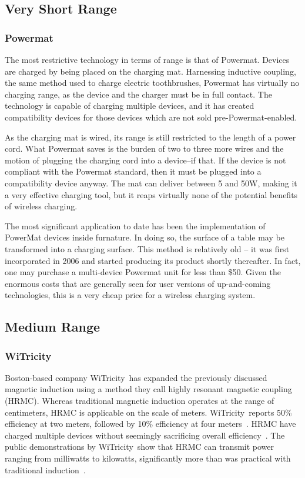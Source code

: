 \subsection{Very Short Range}
\subsubsection{Powermat}
The most restrictive technology in terms of range is that of Powermat. Devices are charged by being placed on the charging mat. Harnessing inductive coupling, the same method used to charge electric toothbrushes, Powermat has virtually no charging range, as the device and the charger must be in full contact. The technology is capable of charging multiple devices, and it has created compatibility devices for those devices which are not sold pre-Powermat-enabled.

As the charging mat is wired, its range is still restricted to the length of a power cord. What Powermat saves is the burden of two to three more wires and the motion of plugging the charging cord into a device--if that. If the device is not compliant with the Powermat standard, then it must be plugged into a compatibility device anyway.
The mat can deliver between 5 and 50W, making it a very effective charging tool, but it reaps virtually none of the potential benefits of wireless charging. 

The most significant application to date has been the implementation of PowerMat devices inside furnature\cite{rogercheng205}. In doing so, the surface of a table may be transformed into a charging surface. This method is relatively old -- it was first incorporated in 2006  and started producing its product shortly thereafter. In fact, one may purchase a multi-device Powermat unit for less than \$50. Given the enormous costs that are generally seen for user versions of up-and-coming technologies, this is a very cheap price for a wireless charging system.

\subsection{Medium Range}

\subsubsection{WiTricity}
Boston-based company WiTricity\textregistered~has expanded the previously discussed magnetic induction using a method they call highly resonant magnetic coupling (HRMC). Whereas traditional magnetic induction operates at the range of centimeters, HRMC is applicable on the scale of meters. WiTricity\textregistered~reports 50\% efficiency at two meters, followed by 10\% efficiency at four meters~\cite{kesler_highly_2013,tucker_contribution_2013}. HRMC have charged multiple devices without seemingly sacrificing overall efficiency~\cite{kesler_highly_2013}. The public demonstrations by WiTricity\textregistered~show that HRMC can transmit power ranging from milliwatts to kilowatts, significantly more than was practical with traditional induction~\cite{kesler_highly_2013}.

